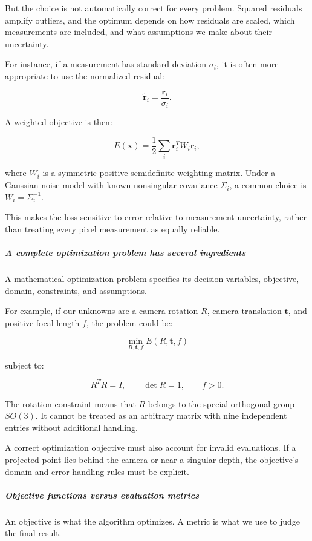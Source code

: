 But the choice is not automatically correct for every problem. Squared residuals amplify outliers, and the optimum depends on how residuals are scaled, which measurements are included, and what assumptions we make about their uncertainty.

For instance, if a measurement has standard deviation \(\sigma_i\), it is often more appropriate to use the normalized residual:

\[
\tilde{\mathbf r}_i= \frac{\mathbf r_i}{\sigma_i}.
\]

A weighted objective is then:

\[
E(\mathbf x)= \frac12\sum_i \mathbf r_i^TW_i\mathbf r_i,
\]

where \(W_i\) is a symmetric positive-semidefinite weighting matrix. Under a Gaussian noise model with known nonsingular covariance \(\Sigma_i\), a common choice is \(W_i=\Sigma_i^{-1}\).

This makes the loss sensitive to error relative to measurement uncertainty, rather than treating every pixel measurement as equally reliable.

\subparagraph{A complete optimization problem has several ingredients}\label{a-complete-optimization-problem-has-several-ingredients}

A mathematical optimization problem specifies its decision variables, objective, domain, constraints, and assumptions.

For example, if our unknowns are a camera rotation \(R\), camera translation \(\mathbf t\), and positive focal length \(f\), the problem could be:

\[
\min_{R,\mathbf t,f}E(R,\mathbf t,f)
\]

subject to:

\[
R^TR=I,\qquad \det R=1,\qquad f>0.
\]

The rotation constraint means that \(R\) belongs to the special orthogonal group \(SO(3)\). It cannot be treated as an arbitrary matrix with nine independent entries without additional handling.

A correct optimization objective must also account for invalid evaluations. If a projected point lies behind the camera or near a singular depth, the objective's domain and error-handling rules must be explicit.

\subparagraph{Objective functions versus evaluation metrics}\label{objective-functions-versus-evaluation-metrics}

An objective is what the algorithm optimizes. A metric is what we use to judge the final result.

